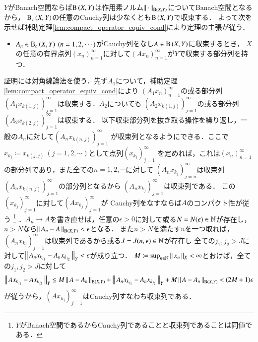 	\begin{prf}
		$Y$がBanach空間ならば$\mathrm{B}\left(X,Y\right) $は作用素ノルム$\left\|\, \cdot\, \right\|_{\mathrm{B}\left(X,Y\right) }$についてBanach空間となるから，
		$\mathrm{B}_c\left(X,Y\right) $の任意のCauchy列は少なくとも$\mathrm{B}\left(X,Y\right) $で収束する．
		よって次を示せば補助定理\ref{lem:compact_operator_equiv_cond}により定理の主張が従う．
		\begin{itemize}
			\item $A_n \in \Cop{X}{Y} \ (n=1,2,\cdots)$がCauchy列をなし$A \in \mathrm{B}\left(X,Y\right) $に収束するとき，
			$X$の任意の有界点列$(x_n)_{n=1}^{\infty}$に対して$(Ax_n)_{n=1}^{\infty}$が$Y$で収束する部分列を持つ．
		\end{itemize}
		証明には対角線論法を使う．先ず$A_1$について，補助定理\ref{lem:compact_operator_equiv_cond}により
		$\left(A_1x_n\right)_{n=1}^{\infty}$の或る部分列$\left(A_1x_{k(1,j)}\right)_{j=1}^{\infty}$は収束する．$A_2$についても
		$\left(A_2x_{k(1,j)}\right)_{j=1}^{\infty}$の或る部分列$\left(A_2x_{k(2,j)}\right)_{j=1}^{\infty}$は収束する．
		以下収束部分列を抜き取る操作を繰り返し，一般の$A_n$に対して$\left(A_nx_{k(n,j)}\right)_{j=1}^{\infty}$
		が収束列となるようにできる．ここで$x_{k_j} \coloneqq x_{k(j,j)}\ (j=1,2,\cdots)$として点列$(x_{k_j})_{j=1}^{\infty}$
		を定めれば，これは$(x_n)_{n=1}^{\infty}$の部分列であり，また全ての$n=1,2,\cdots$に対して
		$\left(A_nx_{k_j}\right)_{j=n}^{\infty}$は収束列$\left(A_nx_{k(n,j)}\right)_{j=1}^{\infty}$の部分列となるから
		$\left(A_nx_{k_j}\right)_{j=1}^{\infty}$は収束列である．
		この$(x_{k_j})_{j=1}^{\infty}$に対して$\left(Ax_{k_j}\right)_{j=1}^{\infty}$が
		Cauchy列をなすならば$A$のコンパクト性が従う
		\footnote{
			$Y$がBanach空間であるからCauchy列であることと収束列であることは同値である．
		}
		．$A_n \rightarrow A$を書き直せば，任意の$\epsilon > 0$に対して或る$N = N(\epsilon) \in \mathbb{N}$が存在し，$n > N$なら$\left\|\, A_n - A\, \right\|_{\mathrm{B}\left(X,Y\right) } < \epsilon$となる．
		また$n > N$を満たす$n$を一つ取れば，$\left(A_nx_{k_j}\right)_{j=1}^{\infty}$は収束列であるから或る$J=J(n,\epsilon) \in \mathbb{N}$が存在し
		全ての$j_1,j_2 > J$に対して$\left\|\, A_nx_{k_{j_1}} - A_nx_{k_{j_2}}\, \right\|_{Y} < \epsilon$が成り立つ．
		$M \coloneqq \operatorname*{sup}_{n\in\mathbb{N}} \left\|\, x_n\, \right\|_{X} < \infty$とおけば，全ての$j_1,j_2 > J$に対して
		\begin{align}
			\left\|\, Ax_{k_{j_1}} - Ax_{k_{j_2}}\, \right\|_{Y} \leq M\left\|\, A- A_n\, \right\|_{\mathrm{B}\left(X,Y\right) } + \left\|\, A_nx_{k_{j_1}} - A_nx_{k_{j_2}}\, \right\|_{Y} + M\left\|\, A- A_n\, \right\|_{\mathrm{B}\left(X,Y\right) } < (2M+1)\epsilon
		\end{align}
		が従うから，$\left(Ax_{k_j}\right)_{j=1}^{\infty}$はCauchy列すなわち収束列である．
		\QED
	\end{prf}
	
